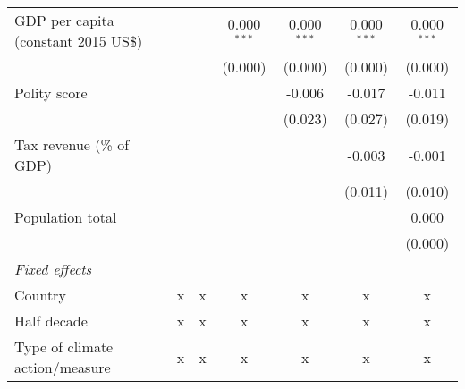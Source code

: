 \begin{tabular}{lcccccc}
   GDP per capita (constant 2015 US\$)                                                                 &               &                & 0.000$^{***}$  & 0.000$^{***}$  & 0.000$^{***}$  & 0.000$^{***}$\\   
                                                                                                       &               &                & (0.000)        & (0.000)        & (0.000)        & (0.000)\\   
   Polity score                                                                                        &               &                &                & -0.006         & -0.017         & -0.011\\   
                                                                                                       &               &                &                & (0.023)        & (0.027)        & (0.019)\\   
   Tax revenue (\% of GDP)                                                                             &               &                &                &                & -0.003         & -0.001\\   
                                                                                                       &               &                &                &                & (0.011)        & (0.010)\\   
   Population total                                                                                    &               &                &                &                &                & 0.000\\   
                                                                                                       &               &                &                &                &                & (0.000)\\   
   \emph{Fixed effects}\\
   Country                                                                                             & x             & x              & x              & x              & x              & x\\  
   Half decade                                                                                         & x             & x              & x              & x              & x              & x\\  
   Type of climate action/measure                                                                      & x             & x              & x              & x              & x              & x\\  

\end{tabular}
